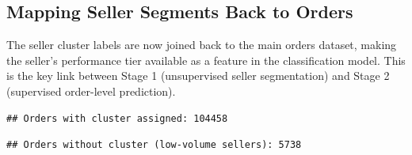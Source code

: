 \documentclass[
]{article}
\newenvironment{Shaded}{\begin{snugshade}}{\end{snugshade}}
\newcommand{\AttributeTok}[1]{\textcolor[rgb]{0.13,0.29,0.53}{#1}}
\newcommand{\CommentTok}[1]{\textcolor[rgb]{0.56,0.35,0.01}{\textit{#1}}}
\newcommand{\ConstantTok}[1]{\textcolor[rgb]{0.56,0.35,0.01}{#1}}
\newcommand{\FunctionTok}[1]{\textcolor[rgb]{0.13,0.29,0.53}{\textbf{#1}}}
\newcommand{\NormalTok}[1]{#1}
\newcommand{\OtherTok}[1]{\textcolor[rgb]{0.56,0.35,0.01}{#1}}
\newcommand{\SpecialCharTok}[1]{\textcolor[rgb]{0.81,0.36,0.00}{\textbf{#1}}}
\newcommand{\StringTok}[1]{\textcolor[rgb]{0.31,0.60,0.02}{#1}}
\begin{document}
\subsection{Mapping Seller Segments Back to
Orders}\label{mapping-seller-segments-back-to-orders}

The seller cluster labels are now joined back to the main orders
dataset, making the seller's performance tier available as a feature in
the classification model. This is the key link between Stage 1
(unsupervised seller segmentation) and Stage 2 (supervised order-level
prediction).

\begin{Shaded}
\end{Shaded}

\begin{verbatim}
## Orders with cluster assigned: 104458
\end{verbatim}

\begin{Shaded}
\end{Shaded}

\begin{verbatim}
## Orders without cluster (low-volume sellers): 5738
\end{verbatim}
\end{document}
